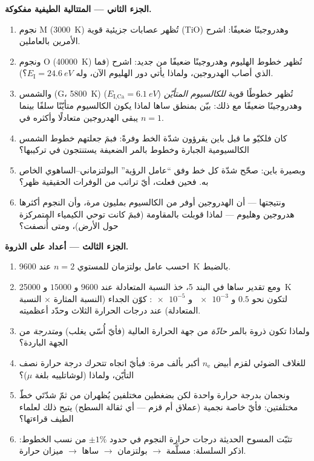 \begin{problem}
\medskip\noindent\textbf{الجزء الثاني --- المتتالية الطيفية
مفكوكة.}
\begin{enumerate}[resume]
  \item نجوم M (\qty{3000}{K}) تُظهر عصابات جزيئية قوية (TiO)
        وهدروجينًا ضعيفًا: اشرح الأمرين بالعاملين.
  \item ونجوم O (\qty{40000}{K}) تُظهر خطوط الهليوم وهدروجينًا
        ضعيفًا من جديد: اشرح (فما الذي أصاب الهدروجين، ولماذا
        يأتي دور الهليوم الآن، وله $E_{\text{I}} = \qty{24.6}{eV}$؟).
  \item والشمس (G، \qty{5800}{K}) تُظهر خطوطًا قوية
        \emph{للكالسيوم المتأيّن} ($E_{\text{I,Ca}} = \qty{6.1}{eV}$)
        وهدروجينًا ضعيفًا مع ذلك: بيّن بمنطق ساها لماذا يكون الكالسيوم
        متأيّنًا سلفًا بينما يبقى الهدروجين متعادلًا وأكثره
        في $n = 1$.
  \item كان فلكيّو ما قبل باين يقرؤون شدّة الخط وفرةً:
        فبمَ جعلتهم خطوط الشمس الكالسيومية الجبارة وخطوط بالمر
        الضعيفة يستنتجون في تركيبها؟
  \item وبصيرة باين: صحّح شدّة كل خط وفق ``عامل الرؤية''
        البولتزماني--الساهوي الخاص به. فحين فعلت، أيّ
        تراتب من الوفرات الحقيقية ظهر؟
  \item ونتيجتها --- أن الهدروجين أوفر من الكالسيوم بمليون
        مرة، وأن النجوم أكثرها هدروجين وهليوم --- لماذا
        قوبلت بالمقاومة (فبمَ كانت توحي الكيمياء المتمركزة
        حول الأرض)، ومتى أُنصفت؟
\end{enumerate}

\medskip\noindent\textbf{الجزء الثالث --- أعداد على الذروة.}
\begin{enumerate}[resume]
  \item احسب عامل بولتزمان للمستوي $n = 2$ عند
        \qty{9600}{K} بالضبط.
  \item ومع تقدير ساها في البند 5، خذ النسبة المتعادلة
        عند $9600$ و $15000$ و \qty{25000}{K} لتكون
        نحو $0.5$ و $\num{e-3}$ و $\num{e-5}$: كوّن الجداء
        (النسبة المثارة $\times$ النسبة المتعادلة) عند درجات
        الحرارة الثلاث وحدّد أعظميته.
  \item ولماذا تكون ذروة بالمر \emph{حادّة} من جهة الحرارة العالية
        (فأيّ أُسّي يغلب) و\emph{متدرجة} من الجهة
        الباردة؟
  \item للغلاف الضوئي لقزم أبيض $n_{\text{e}}$ أكبر بألف
        مرة: فبأيّ اتجاه تتحرك درجة حرارة نصف
        التأيّن، ولماذا (لوشاتلييه بلغة $\mu$)؟
  \item ونجمان بدرجة حرارة واحدة لكن بضغطين مختلفين
        يُظهران من ثمّ شدّتَي خطّ مختلفتين: فأيّ خاصة
        نجمية (عملاق أم قزم --- أي ثقالة السطح)
        يتيح ذلك لعلماء الطيف قراءتها؟
  \item تثبّت المسوح الحديثة درجات حرارة النجوم في حدود $\pm1\%$ من
        نسب الخطوط: اذكر السلسلة: مسلَّمة $\to$ بولتزمان
        $\to$ ساها $\to$ ميزان حرارة.
\end{enumerate}


\end{problem}
